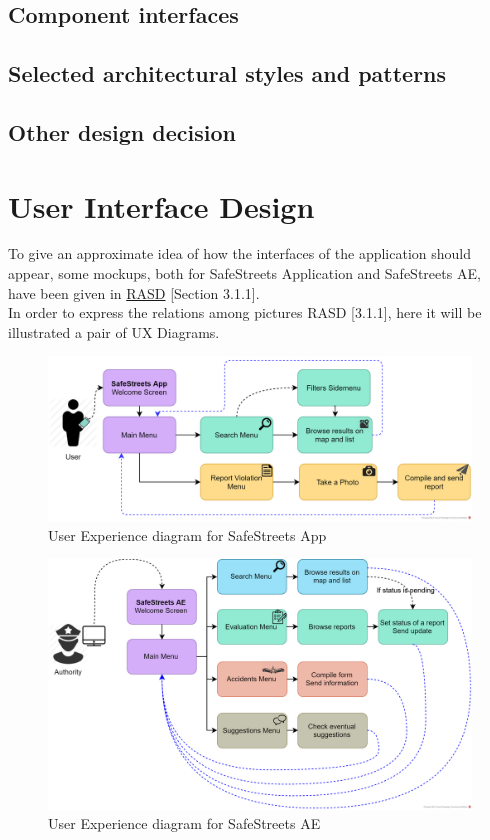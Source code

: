 \documentclass{article}
\begin{document}
		\subsection{Component interfaces}
		\subsection{Selected architectural styles and patterns}
		\subsection{Other design decision}
	\clearpage	
	\section{User Interface Design}
	To give an approximate idea of how the interfaces of the application should appear, some mockups, both for SafeStreets Application and SafeStreets AE, have been given in \href{run:d:../DeliveryFolder/RASD1.pdf}{RASD} [Section 3.1.1].\\ 
	In order to express the relations among pictures RASD [3.1.1], here it will be illustrated a pair of UX Diagrams.
	
	\begin{figure}[H]
		\centering
		\includegraphics[width=1\textwidth]{diagrams/UXSafeStreetsApp.png}
		\caption[User Experience diagram for SafeStreets App]{User Experience diagram for SafeStreets App}
		\label{fig:UX_SSApp}
	\end{figure}

	\begin{figure}[H]
		\centering
		\includegraphics[width=1\textwidth]{diagrams/UXSafeStreetsAE.png}
		\caption[User Experience diagram for SafeStreets AE]{User Experience diagram for SafeStreets AE}
		\label{fig:UX_SSAE}
	\end{figure}
		
\end{document}
